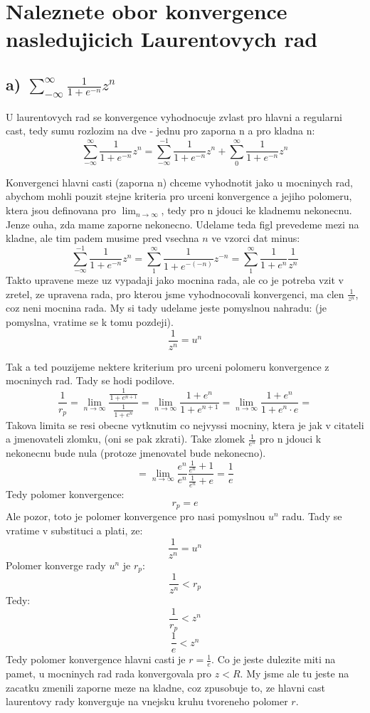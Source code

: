 \section{Naleznete obor konvergence nasledujicich Laurentovych rad}
\subsection{a) $\sum_{-\infty}^\infty \frac{1}{1+e^{-n}}z^n$}

U laurentovych rad se konvergence vyhodnocuje zvlast pro hlavni a regularni cast, tedy sumu rozlozim na dve - jednu pro zaporna n a pro kladna n:
$$\sum_{-\infty}^\infty \frac{1}{1+e^{-n}}z^n = \sum_{-\infty}^{-1} \frac{1}{1+e^{-n}}z^n + \sum_0^\infty \frac{1}{1+e^{-n}}z^n$$

Konvergenci hlavni casti (zaporna n) chceme vyhodnotit jako u mocninych rad, abychom mohli pouzit stejne kriteria pro urceni konvergence a jejiho polomeru, ktera jsou definovana pro $\lim_{n \to \infty}$, tedy pro n jdouci ke kladnemu nekonecnu. Jenze ouha, zda mame zaporne nekonecno. Udelame teda figl prevedeme mezi na kladne, ale tim padem musime pred vsechna $n$ ve vzorci dat minus:
$$ \sum_{-\infty}^{-1} \frac{1}{1+e^{-n}}z^n = \sum_1 ^\infty \frac{1}{1+e^{-(-n)}}z^{-n} = \sum_1 ^\infty \frac{1}{1+e^{n}}\frac{1}{z^n}$$
Takto upravene meze uz vypadaji jako mocnina rada, ale co je potreba vzit v zretel, ze upravena rada, pro kterou jsme vyhodnocovali konvergenci, ma clen $\frac{1}{z^n}$, coz neni mocnina rada. My si tady udelame jeste pomyslnou nahradu: (je pomyslna, vratime se k tomu pozdeji).
$$\frac{1}{z^n} = u^n$$

Tak a ted pouzijeme nektere kriterium pro urceni polomeru konvergence z mocninych rad. Tady se hodi podilove.
$$\frac{1}{r_p} = \lim_{n \to \infty} \frac{\frac{1}{1+e^{n+1}}}{\frac{1}{1+e^{n}}} = \lim_{n \to \infty} \frac{1+e^n}{1+e^{n+1}} = \lim_{n \to \infty} \frac{1+e^n}{1+e^{n}\cdot e} =$$
Takova limita se resi obecne vytknutim co nejvyssi mocniny, ktera je jak v citateli a jmenovateli zlomku, (oni se pak zkrati). Take zlomek $\frac{1}{e^n}$ pro n jdouci k nekonecnu bude nula (protoze jmenovatel bude nekonecno).
$$ = \lim_{n \to \infty} \frac{e^n}{e^n}\frac{\frac{1}{e^n}+1}{\frac{1}{e^n}+e} = \frac{1}{e}$$
Tedy polomer konvergence:
$$r_p = e$$
Ale pozor, toto je polomer konvergence pro nasi pomyslnou $u^n$ radu. Tady se vratime v substituci a plati, ze:
$$\frac{1}{z^n} = u^n$$
Polomer konverge rady $u^n$ je $r_p$:
$$\frac{1}{z^n} < r_p$$
Tedy:
$$\frac{1}{r_p} < z^n$$
$$\frac{1}{e} < z^n$$
Tedy polomer konvergence hlavni casti je $r = \frac{1}{e}$. Co je jeste dulezite miti na pamet, u mocninych rad rada konvergovala pro $z < R$. My jsme ale tu jeste na zacatku zmenili zaporne meze na kladne, coz zpusobuje to, ze hlavni cast laurentovy rady konverguje na vnejsku kruhu tvoreneho polomer $r$.

